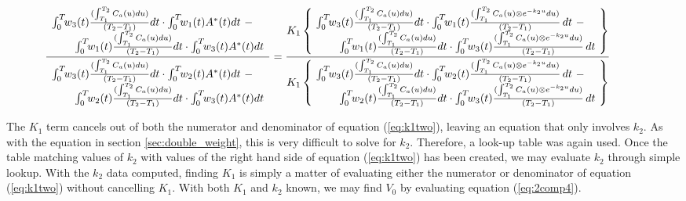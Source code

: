 \documentclass[12pt]{article}
\begin{document}
%
\begin{equation}
\hspace*{-1.0cm}
\frac{
\begin{array}{lcr}
\multicolumn{2}{l}{
\int_{0}^{T}\!\!w_{3}(t) \frac{(\int_{T_1}^{T_2}C_{a}(u)du)}{(T_2 - T_1)} dt \cdot 
\int_{0}^{T}\!\!w_{1}(t)A^{*}(t)dt\,\,-}&\\
&\multicolumn{2}{r} {\int_{0}^{T}\!\!w_{1}(t)
\frac{(\int_{T_1}^{T_2}C_{a}(u)du)}{(T_2 - T_1)} dt \cdot
\int_{0}^{T}\!\!w_{3}(t)A^{*}(t)dt}\end{array}
}
{
\begin{array}{lcr}
\multicolumn{2}{l}
{\int_{0}^{T}\!\!w_{3}(t) \frac{(\int_{T_1}^{T_2}C_{a}(u)du)}{(T_2 - T_1)} dt \cdot 
\int_{0}^{T}\!\!w_{2}(t)A^{*}(t)dt\,\,-}&\\
&\multicolumn{2}{r}
{\int_{0}^{T}\!\!w_{2}(t) \frac{(\int_{T_1}^{T_2}C_{a}(u)du)}{(T_2 - T_1)} dt \cdot 
\int_{0}^{T}\!\!w_{3}(t)A^{*}(t)dt}\end{array}
}
 =
\frac{
K_{1} \left\{\!\!\!\! \begin{array}{c}
\begin{array}{lcr}\multicolumn{2}{l}
{\int_{0}^{T}\!\!w_{3}(t) \frac{(\int_{T_1}^{T_2}C_{a}(u)du)}{(T_2 -
T_1)} dt \cdot
\int_{0}^{T}\!\!w_{1}(t) \frac{(\int_{T_1}^{T_2}C_{a}(u) \otimes
e^{-k_{2}u} du)}{(T_2 - T_1)}\, dt\,\,-}&
\\ 
&\multicolumn{2}{r} {\int_{0}^{T}\!\!w_{1}(t)
\frac{(\int_{T_1}^{T_2}C_{a}(u)du)}{(T_2 - T_1)} dt \cdot
\int_{0}^{T}\!\!w_{3}(t)  \frac{(\int_{T_1}^{T_2}C_{a}(u) \otimes
e^{-k_{2}u} du)}{(T_2 - T_1)}\, dt}
\end{array} \end{array} \!\!\!\! \right\} }
{
K_{1} \left\{ \!\!\!\! \begin{array}{c}
\begin{array}{lcr} 
\multicolumn{2}{l}{\int_{0}^{T}\!\!w_{3}(t) \frac{(\int_{T_1}^{T_2}C_{a}(u)du)}{(T_2 - T_1)} dt \cdot 
\int_{0}^{T}\!\!w_{2}(t) \frac{(\int_{T_1}^{T_2}C_{a}(u) \otimes
e^{-k_{2}u} du)}{(T_2 - T_1)}\, dt\,\,-} &
\\
&\multicolumn{2}{r}{\int_{0}^{T}\!\!w_{2}(t)
\frac{(\int_{T_1}^{T_2}C_{a}(u)du)}{(T_2 - T_1)} dt \cdot
\int_{0}^{T}\!\!w_{3}(t)  \frac{(\int_{T_1}^{T_2}C_{a}(u) \otimes
e^{-k_{2}u} du)}{(T_2 - T_1)}\, dt} \end{array} \end{array} \!\!\!\!
\right\} }
\label{eq:k1two}
\end{equation}

The $K_{1}$ term cancels out of both the numerator and denominator of
equation (\ref{eq:k1two}), leaving an equation that only involves
$k_{2}$.  As with the equation in section \ref{sec:double_weight},
this is very difficult to solve for $k_{2}$.  Therefore, a look-up
table was again used.  Once the table matching values of $k_{2}$ with
values of the right hand side of equation (\ref{eq:k1two}) has been
created, we may evaluate $k_{2}$ through simple lookup.  With the
$k_{2}$ data computed, finding $K_{1}$ is simply a matter of
evaluating either the numerator or denominator of equation
(\ref{eq:k1two}) without cancelling $K_{1}$.  With both $K_{1}$ and
$k_{2}$ known, we may find $V_{0}$ by evaluating equation
(\ref{eq:2comp4}).
\end{document}
